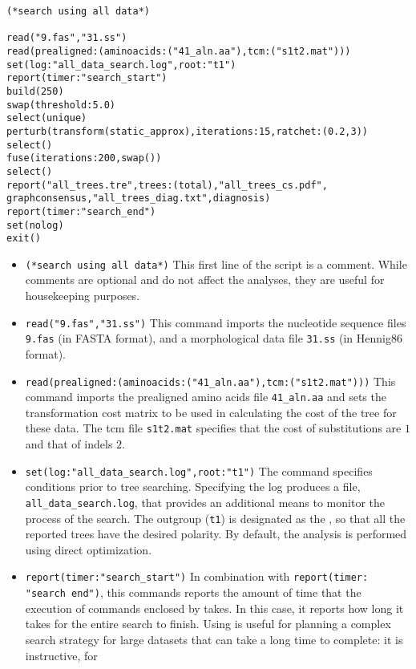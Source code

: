 \begin{verbatim}
(*search using all data*)

read("9.fas","31.ss")
read(prealigned:(aminoacids:("41_aln.aa"),tcm:("s1t2.mat")))
set(log:"all_data_search.log",root:"t1")
report(timer:"search_start")
build(250)
swap(threshold:5.0)
select(unique)
perturb(transform(static_approx),iterations:15,ratchet:(0.2,3))
select()
fuse(iterations:200,swap())
select()
report("all_trees.tre",trees:(total),"all_trees_cs.pdf",
graphconsensus,"all_trees_diag.txt",diagnosis)
report(timer:"search_end")
set(nolog)
exit()
\end{verbatim}

\begin{itemize}
\item \texttt{(*search using all data*)} This first line of the
script is a comment. While comments are optional and do not affect
the analyses, they are useful for housekeeping purposes. 
\item \texttt{read("9.fas","31.ss")} This command imports the nucleotide
sequence files \texttt{9.fas} (in FASTA format), and a morphological
data file \texttt{31.ss} (in Hennig86 format).  
\item \texttt{read(prealigned:(aminoacids:("41\_aln.aa"),tcm:("s1t2.mat")))} This
command imports the prealigned amino acids file \texttt{41\_aln.aa}
and sets the transformation cost matrix to be used in calculating
the cost of the tree for these data.  The tcm file \texttt{s1t2.mat}
specifies that the cost of substitutions are $1$ and that of indels
$2$. 
\item \texttt{set(log:"all\_data\_search.log",root:"t1")} The
 command specifies conditions prior to tree searching.
Specifying the log produces a file, \texttt{all\_data\_search.log},
that provides an additional means to monitor the process of the
search. The outgroup (\texttt{t1}) is designated as the ,
so that all the reported trees have the desired polarity. By default,
the analysis is performed using direct optimization.  
\item \texttt{report(timer:"search\_start")} In combination with
\texttt{report(timer:\\"search end")}, this commands reports the
amount of time that the execution of commands enclosed by
 takes. In this case, it reports how long it
takes for the entire search to finish. Using 
is useful for planning a complex search strategy for large datasets
that can take a long time to complete: it is instructive, for

\end{itemize}

